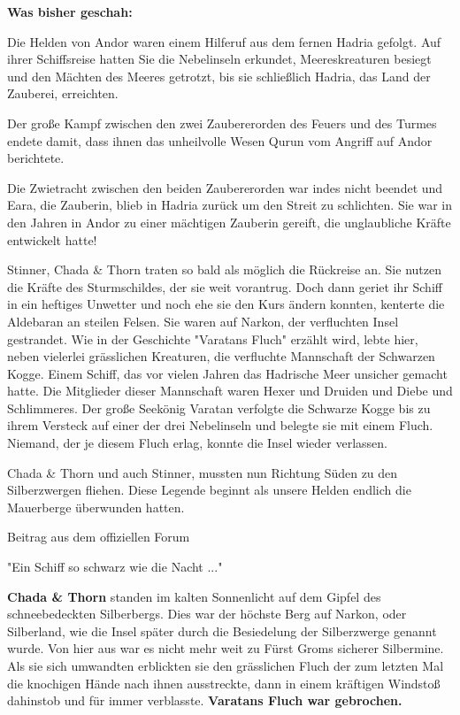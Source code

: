 \documentclass[10pt, a4paper, oneside]{book}
\begin{document}
\begin{multicols}{2}
\textbf{Was bisher geschah:}

Die Helden von Andor waren einem Hilferuf aus dem fernen Hadria gefolgt. Auf ihrer Schiffsreise hatten Sie die Nebelinseln erkundet, Meereskreaturen besiegt und den Mächten des Meeres getrotzt, bis sie schließlich Hadria, das Land der Zauberei, erreichten.

Der große Kampf zwischen den zwei Zaubererorden des Feuers und des Turmes endete damit, dass ihnen das unheilvolle Wesen Qurun vom Angriff auf Andor berichtete.

Die Zwietracht zwischen den beiden Zaubererorden war indes nicht beendet und Eara, die Zauberin, blieb in Hadria zurück um den Streit zu schlichten. Sie war in den Jahren in Andor zu einer mächtigen Zauberin gereift, die unglaubliche Kräfte entwickelt hatte!\bigskip

Stinner, Chada \& Thorn traten so bald als möglich die Rückreise an. Sie nutzen die Kräfte des Sturmschildes, der sie weit vorantrug. Doch dann geriet ihr Schiff in ein heftiges Unwetter und noch ehe sie den Kurs ändern konnten, kenterte die Aldebaran an steilen Felsen. Sie waren auf Narkon, der verfluchten Insel gestrandet. Wie in der Geschichte "Varatans Fluch" erzählt wird, lebte hier, neben vielerlei grässlichen Kreaturen, die verfluchte Mannschaft der Schwarzen Kogge. Einem Schiff, das vor vielen Jahren das Hadrische Meer unsicher gemacht hatte. Die Mitglieder dieser Mannschaft waren Hexer und Druiden und Diebe und Schlimmeres. Der große Seekönig Varatan verfolgte die Schwarze Kogge bis zu ihrem Versteck auf einer der drei Nebelinseln und belegte sie mit einem Fluch. Niemand, der je diesem Fluch erlag, konnte die Insel wieder verlassen.

Chada \& Thorn und auch Stinner, mussten nun Richtung Süden zu den Silberzwergen fliehen. Diese Legende beginnt als unsere Helden endlich die Mauerberge überwunden hatten.

\begin{center}
    Beitrag aus dem offiziellen Forum

    "Ein Schiff so schwarz wie die Nacht ..."
\end{center}



\textbf{Chada \& Thorn} standen im kalten Sonnenlicht auf dem Gipfel des schneebedeckten Silberbergs. Dies war der höchste Berg auf Narkon, oder Silberland, wie die Insel später durch die Besiedelung der Silberzwerge genannt wurde. Von hier aus war es nicht mehr weit zu Fürst Groms sicherer Silbermine. Als sie sich umwandten erblickten sie den grässlichen Fluch der zum letzten Mal die knochigen Hände nach ihnen ausstreckte, dann in einem kräftigen Windstoß dahinstob und für immer verblasste. \textbf{Varatans Fluch war gebrochen.}


\end{multicols}
\end{document}
